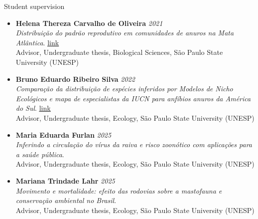\documentclass{resume}
\begin{document}
\begin{rSection}{Student supervision}
\begin{itemize}
\item {\bf Helena Thereza Carvalho de Oliveira} \hfill{\em 2021}\\
{\it Distribuição do padrão reprodutivo em comunidades de anuros na Mata Atlântica}. \href{https://repositorio.unesp.br/items/c8b867f6-4fd0-4e07-853a-abbf74d64c23}{\underline{link}}\\
Advisor, Undergraduate thesis, Biological Sciences, São Paulo State University (UNESP)

\item {\bf Bruno Eduardo Ribeiro Silva} \hfill{\em 2022}\\
{\it Comparação da distribuição de espécies inferidos por Modelos de Nicho Ecológicos e mapa de especialistas da IUCN para anfíbios anuros da América do Sul}. \href{https://repositorio.unesp.br/items/190f34f7-f0a7-4458-9dfc-ef8890bf0ca2}{\underline{link}}\\
Advisor, Undergraduate thesis, Ecology, São Paulo State University (UNESP)

\item {\bf Maria Eduarda Furlan} \hfill{\em 2025}\\
{\it Inferindo a circulação do vírus da raiva e risco zoonótico com aplicações para a saúde pública}.\\
Advisor, Undergraduate thesis, Ecology, São Paulo State University (UNESP)

\item {\bf Mariana Trindade Lahr} \hfill{\em 2025}\\
{\it Movimento e mortalidade: efeito das rodovias sobre a mastofauna e conservação ambiental no Brasil}.\\
Advisor, Undergraduate thesis, Ecology, São Paulo State University (UNESP)
\end{itemize}
\end{rSection}

\end{document}

